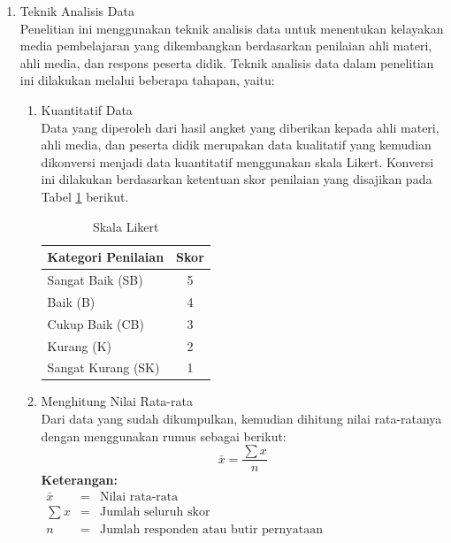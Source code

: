 \begin{enumerate}
\begin{enumerate}
\begin{enumerate}
\begin{table}[H]
\begin{tabular}{|c|p{3cm}|p{6.5cm}|}
                    
                \end{tabular}
            \end{table}
        \end{enumerate}
    \end{enumerate}
    \item Teknik Analisis Data\\
    \hspace*{1cm}Penelitian ini menggunakan teknik analisis data untuk menentukan kelayakan media pembelajaran yang dikembangkan berdasarkan penilaian ahli materi, ahli media, dan respons peserta didik. Teknik analisis data dalam penelitian ini dilakukan melalui beberapa tahapan, yaitu:
    \begin{enumerate}
        \item Kuantitatif Data\\
        \hspace*{1cm}Data yang diperoleh dari hasil angket yang diberikan kepada ahli materi, ahli media, dan peserta didik merupakan data kualitatif yang kemudian dikonversi menjadi data kuantitatif menggunakan skala Likert. Konversi ini dilakukan berdasarkan ketentuan skor penilaian yang disajikan pada Tabel \ref{likert} berikut.
        \begin{table}[H]
            \centering
            \caption{Skala Likert}
            \label{likert}
            \begin{tabular}{|p{5cm}|c|}
                \hline
                \textbf{Kategori Penilaian} & \textbf{Skor}\\
                \hline
                Sangat Baik (SB) & 5\\
                Baik (B) & 4\\
                Cukup Baik (CB) & 3\\
                Kurang (K) & 2\\
                Sangat Kurang (SK) & 1\\
                \hline
            \end{tabular}
        \end{table}
        \item Menghitung Nilai Rata-rata\\
        \hspace*{1cm}Dari data yang sudah dikumpulkan, kemudian dihitung nilai rata-ratanya dengan menggunakan rumus sebagai berikut:
        \begin{equation}
            \bar{x}=\frac{\sum x}{n}
        \end{equation}
        \textbf{Keterangan:}\\
        \( \begin{array}{lcl}
            \bar{x} & = & \text{Nilai rata-rata}\\
            \sum x & = & \text{Jumlah seluruh skor}\\
            n & = & \text{Jumlah responden atau butir pernyataan}
        \end{array} \)


\end{enumerate}
\end{enumerate}
